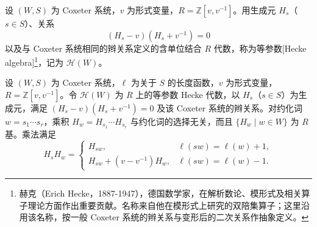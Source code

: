 \begin{definition}\label{b5:def:hecke-algebra}
	设 \((W,S)\) 为 Coxeter 系统，\(v\) 为形式变量，\(R=\mathbb Z[v,v^{-1}]\)。用生成元 \(H_s\)（\(s\in S\)）、关系
	\[
		(H_s-v)(H_s+v^{-1})=0
	\]
	以及与 Coxeter 系统相同的辫关系定义的含单位结合 \(R\) 代数，称为等参数[Hecke algebra]\footnote{赫克（Erich Hecke，1887-1947），德国数学家，在解析数论、模形式及相关算子理论方面作出重要贡献。名称来自他在模形式上研究的双陪集算子；这里沿用该名称，按一般 Coxeter 系统的辫关系与变形后的二次关系作抽象定义。}，记为 \(\mathcal H(W)\)。
\end{definition}

\begin{theorem}\label{b5:thm:hecke-standard-basis}
	设 \((W,S)\) 为 Coxeter 系统，\(\ell\) 为关于 \(S\) 的长度函数，\(v\) 为形式变量，\(R=\mathbb Z[v,v^{-1}]\)。令 \(\mathcal H(W)\) 为 \(R\) 上的等参数 Hecke 代数，以 \(H_s\)（\(s\in S\)）为生成元，满足 \((H_s-v)(H_s+v^{-1})=0\) 及该 Coxeter 系统的辫关系。对约化词 \(w=s_1\cdots s_r\)，乘积 \(H_w=H_{s_1}\cdots H_{s_r}\) 与约化词的选择无关，而且 \(\{H_w\mid w\in W\}\) 为 \(R\) 基。乘法满足
	\begin{equation}\label{b5:eq:hecke-standard-multiplication}
		H_sH_w=
		\begin{cases}
			H_{sw},&\ell(sw)=\ell(w)+1,\\
			H_{sw}+(v-v^{-1})H_w,&\ell(sw)=\ell(w)-1.
		\end{cases}
	\end{equation}
\end{theorem}
